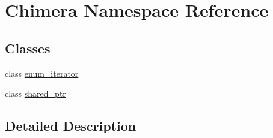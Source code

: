 \hypertarget{namespace_chimera}{}\section{Chimera Namespace Reference}
\label{namespace_chimera}
\subsection*{Classes}
\begin{DoxyCompactItemize}
\item 
class \mbox{\hyperlink{class_chimera_1_1enum__iterator}{enum\+\_\+iterator}}
\item 
class \mbox{\hyperlink{class_chimera_1_1shared__ptr}{shared\+\_\+ptr}}
\end{DoxyCompactItemize}


\subsection{Detailed Description}
